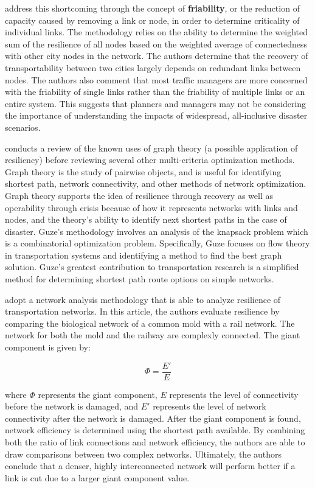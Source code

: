 \citet{ip2011} address this shortcoming through the concept of
\textbf{friability}, or
the reduction of capacity caused by removing a link or node, in order to
determine criticality of individual links. The methodology relies on the
ability
to determine the weighted sum of the resilience of all nodes based on the
weighted average of connectedness with other city nodes in the network. The
authors determine that the recovery of transportability between two cities
largely depends on redundant links between nodes. The authors also comment
that
most traffic managers are more concerned with the friability of single
links
rather than the friability of multiple links or an entire system. This suggests
that planners and managers may not be considering the importance of
understanding the impacts of widespread, all-inclusive disaster scenarios.

\citet{guze2014} conducts a review of the known uses of graph theory
(a possible application of resiliency) before
reviewing several
other multi-criteria optimization methods.
Graph theory is the study of pairwise objects, and is
useful for identifying
shortest path, network connectivity, and other methods of network
optimization. Graph theory
supports the idea of resilience through recovery as well as operability through crisis
because of how it
represents networks with links and nodes, and the theory's ability to identify next
shortest paths in the
case of disaster. Guze’s methodology
involves an
analysis of the knapsack problem which is a combinatorial optimization problem.
Specifically, Guze focuses on flow
theory in transportation
systems and identifying a method to find the best graph solution. Guze’s
greatest contribution to transportation research
is a simplified method
for determining shortest path route options on simple networks.

\citet{osei2014} adopt a network analysis methodology that is able to
analyze
resilience of transportation networks. In this
article, the authors evaluate resilience by comparing the biological
network of a common mold
with a rail network. The network for both the mold and the railway are
complexly connected. The giant component is given by:

\begin{equation}
	\Phi = \frac{E'}{ E}
\end{equation}

\noindent where $\Phi$ represents the giant component, $E$ represents the
level of connectivity before the network is damaged, and $E'$ represents the
level of network connectivity after the network is damaged. After the giant component
is found, network efficiency is determined using the
shortest path available. By combining both the ratio of link connections and
network efficiency, the authors are able to draw comparisons between two
complex networks. Ultimately, the authors conclude that a denser, highly
interconnected network will perform better if a link is cut due to a larger giant component value.

